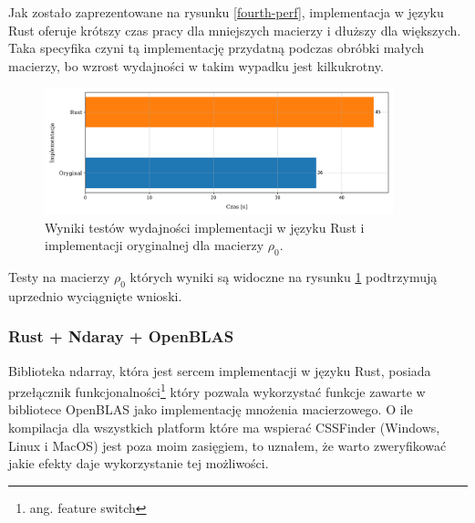 \documentclass[10pt, a4paper]{article}
\begin{document}
\begin{sloppypar}
    Jak zostało zaprezentowane na rysunku \ref{fourth-perf}, implementacja w języku Rust
    oferuje krótszy czas pracy dla mniejszych macierzy i dłuższy dla większych. Taka specyfika
    czyni tą implementację przydatną podczas obróbki małych macierzy, bo wzrost
    wydajności w takim wypadku jest kilkukrotny.

    \FloatBarrier
    \begin{figure}[ht]
      \centering
      \includegraphics[width=0.9\textwidth]{"resources/benchmark_5/plot2.png"}
      \caption{Wyniki testów wydajności implementacji w języku Rust i implementacji oryginalnej dla macierzy $\rho
      _{0}$.}
      \label{fourth-alt-perf}
    \end{figure}
    \FloatBarrier

    Testy na macierzy $\rho_{0}$ których wyniki są widoczne na rysunku \ref{fourth-alt-perf}
    podtrzymują uprzednio wyciągnięte wnioski.

    \subsubsection{ Rust + Ndaray + OpenBLAS }


    Biblioteka ndarray, która jest sercem implementacji w języku Rust, posiada przełącznik
    funkcjonalności\footnote{ang. feature switch} który pozwala wykorzystać funkcje
    zawarte w bibliotece OpenBLAS jako implementację mnożenia macierzowego. O ile kompilacja
    dla wszystkich platform które ma wspierać CSSFinder (Windows, Linux i MacOS) jest
    poza moim zasięgiem, to uznałem, że warto zweryfikować jakie efekty daje
    wykorzystanie tej możliwości.


\end{sloppypar}
\end{document}

